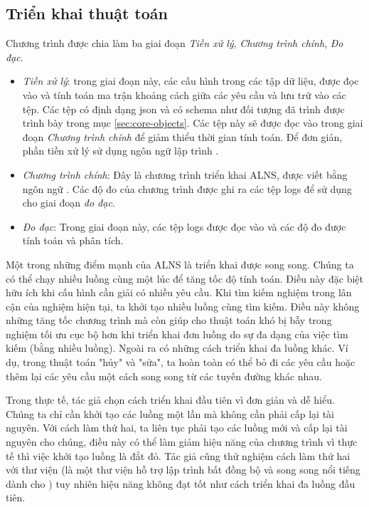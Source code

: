 \subsection{Triển khai thuật toán}
Chương trình được chia làm ba giai đoạn \textit{Tiền xử lý}, \textit{Chương trình chính}, \textit{Đo đạc}.
\begin{itemize}
	\item \textit{Tiền xử lý}: trong giai đoạn này, các cấu hình trong các tập dữ liệu, được đọc vào và tính toán ma trận khoảng cách giữa các yêu cầu và lưu trữ vào các tệp. Các tệp có định dạng json và có schema như đối tượng  đã trình được trình bày trong mục \ref{sec:core-objects}. Các tệp này sẽ được đọc vào trong giai đoạn \textit{Chương trình chính} để giảm thiểu thời gian tính toán. Để đơn giản, phần tiền xử lý sử dụng ngôn ngữ lập trình .
	\item \textit{Chương trình chính}: Đây là chương trình triển khai ALNS, được viết bằng ngôn ngữ . Các độ đo của chương trình được ghi ra các tệp logs để sử dụng cho giai đoạn \textit{đo đạc}.
	\item \textit{Đo đạc}: Trong giai đoạn này, các tệp logs được đọc vào và các độ đo được tính toán và phân tích.
\end{itemize}

Một trong những điểm mạnh của ALNS là triển khai được song song. Chúng ta có thể chạy nhiều luồng cùng một lúc để tăng tốc độ tính toán. Điều này đặc biệt hữu ích khi cấu hình cần giải có nhiều yêu cầu. Khi tìm kiếm nghiệm trong lân cận của nghiệm hiện tại, ta khởi tạo nhiều luồng cùng tìm kiếm. Điều này không những tăng tốc chương trình mà còn giúp cho thuật toán khó bị bẫy trong nghiệm tối ưu cục bộ hơn khi triển khai đơn luồng do sự đa dạng của việc tìm kiếm (bằng nhiều luồng). Ngoài ra có những cách triển khai đa luồng khác. Ví dụ, trong thuật toán "hủy" và "sửa", ta hoàn toàn có thể bỏ đi các yêu cầu hoặc thêm lại các yêu cầu một cách song song từ các tuyến đường khác nhau.

Trong thực tế, tác giả chọn cách triển khai đầu tiên vì đơn giản và dễ hiểu. Chúng ta chỉ cần khởi tạo các luồng một lần mà không cần phải cấp lại tài nguyên. Với cách làm thứ hai, ta liên tục phải tạo các luồng mới và cấp lại tài nguyên cho chúng, điều này có thể làm giảm hiệu năng của chương trình vì thực tế thì việc khởi tạo luồng là đắt đỏ. Tác giả cũng thử nghiệm cách làm thứ hai với thư viện  (là một thư viện hỗ trợ lập trình bất đồng bộ và song song nổi tiếng dành cho ) tuy nhiên hiệu năng không đạt tốt như cách triển khai đa luồng đầu tiên.